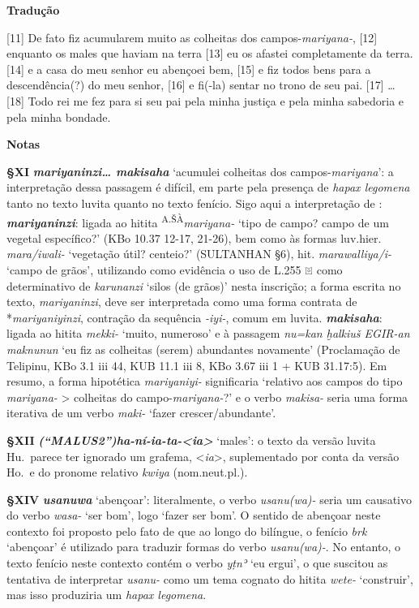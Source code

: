 \bigskip%
\noindent\textbf{Tradução}

[11] De fato fiz acumularem muito as colheitas dos campos-\emph{mariyana-}, [12]
enquanto os males que haviam na terra [13] eu os afastei completamente da terra.
	[14] e a casa do meu senhor eu abençoei bem, [15] e fiz todos bens para a
descendência{(?)} do meu senhor, [16] e fi{(-la)} sentar no trono de seu pai. [17]
\ldots{} [18] Todo rei me fez para si seu pai pela minha justiça e pela minha
sabedoria e pela minha bondade.

\bigskip
\noindent\textbf{Notas}

\smallskip
\noindent\textbf{§XI}\tabto{2em}
\textbf{\emph{mariyaninzi\ldots{} makisaha}} `acumulei
colheitas dos campos-\emph{mariyana}': a interpretação dessa passagem
é difícil, em parte pela presença de \emph{hapax legomena} tanto no texto luvita
quanto no texto fenício.
Sigo aqui a interpretação de \citet{VanDenHout2010}:
\textbf{\emph{mariyaninzi}}: ligada ao hitita
\textsuperscript{A.ŠÀ}\emph{mariyana-} `tipo de
campo? campo de um vegetal específico?' (KBo 10.37 12-17, 21-26), bem como às
formas luv.hier. \emph{mara/iwali-} `vegetação útil? centeio?' (SULTANHAN §6),
hit. \emph{marawalliya/i-} `campo de grãos', utilizando como evidência o uso de
L.255 𔔡 como determinativo de \emph{karunanzi} `silos (de grãos)' nesta
inscrição;
a forma escrita no texto, \emph{mariyaninzi}, deve ser interpretada como uma
forma contrata de *\emph{mariyaniyinzi}, contração da sequência \emph{-iyi-},
comum em luvita.
\textbf{\emph{makisaha}}: ligada ao hitita \emph{mekki-} `muito, numeroso' e à
passagem \emph{nu=kan ḫalkiuš EGIR-an maknunun} `eu fiz as colheitas (serem)
abundantes novamente' (Proclamação de Telipinu, KBo 3.1 iii 44, KUB 11.1 iii 8,
KBo 3.67 iii 1 + KUB 31.17:5).
Em resumo, a forma hipotética \emph{mariyaniyi-} significaria `relativo aos
campos do tipo \emph{mariyana-} > colheitas do campo-\emph{mariyana-}?' e o
verbo \emph{makisa-} seria uma forma iterativa de um verbo \emph{maki-} `fazer
crescer/abundante'.


\smallskip
\noindent\textbf{§XII}\tabto{2em}
\textbf{\emph{\emph{(“MALUS2”)}ha-ní-ia-ta-<ia>}} `males': o texto da versão
luvita Hu.\ parece ter ignorado um grafema, <\emph{ia}>, suplementado por conta
da versão Ho.\ e do pronome relativo \emph{kwiya} (nom.neut.pl.).

\smallskip
\noindent\textbf{§XIV}\tabto{2em}
\textbf{\emph{usanuwa}} `abençoar': literalmente, o verbo \emph{usanu{(wa)}-}
seria um causativo do verbo \emph{wasa-} `ser bom', logo `fazer ser
bom'. O sentido de abençoar neste contexto foi proposto pelo fato de que ao
longo do bilíngue, o fenício \emph{brk} `abençoar' é utilizado para traduzir
formas do verbo \emph{usanu{(wa)}-}.
No entanto, o texto fenício neste contexto contém o verbo \emph{yṭnʾ} `eu
ergui', o que suscitou as tentativa de interpretar \emph{usanu-} como um tema
cognato do hitita \emph{wete-} `construir', mas isso produziria um \emph{hapax
	legomena}.

